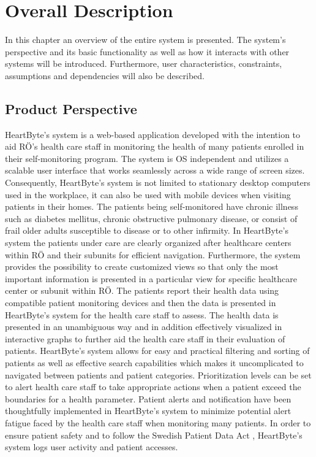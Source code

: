 \documentclass{scrreprt}
\begin{document}
\chapter{Overall Description}
In this chapter an overview of the entire system is presented. The system's perspective and its basic functionality as well as how it interacts with other systems will be introduced. Furthermore, user characteristics, constraints, assumptions and dependencies will also be described.

\section{Product Perspective}
HeartByte’s system is a web-based application developed with the intention to aid RÖ’s health care staff in monitoring the health of many patients enrolled in their self-monitoring program. The system is OS independent and utilizes a scalable user interface that works seamlessly across a wide range of screen sizes. Consequently, HeartByte’s system is not limited to stationary desktop computers used in the workplace, it can also be used with mobile devices when visiting patients in their homes. The patients being self-monitored have chronic illness such as diabetes mellitus, chronic obstructive pulmonary disease, or consist of frail older adults susceptible to disease or to other infirmity. In HeartByte’s system the patients under care are clearly organized after healthcare centers within RÖ and their subunits for efficient navigation. Furthermore, the system provides the possibility to create customized views so that only the most important information is presented in a particular view for specific healthcare center or subunit within RÖ. The patients report their health data using compatible patient monitoring devices and then the data is presented in HeartByte’s system for the health care staff to assess. The health data is presented in an unambiguous way and in addition effectively visualized in interactive graphs to further aid the health care staff in their evaluation of patients. HeartByte’s system allows for easy and practical filtering and sorting of patients as well as effective search capabilities which makes it uncomplicated to navigated between patients and patient categories. Prioritization levels can be set to alert health care staff to take appropriate actions when a patient exceed the boundaries for a health parameter. Patient alerts and notification have been thoughtfully implemented in HeartByte’s system to minimize potential alert fatigue faced by the health care staff when monitoring many patients. In order to ensure patient safety and to follow the Swedish Patient Data Act \cite{patientdatalag}, HeartByte’s system logs user activity and patient accesses.  
\end{document}
